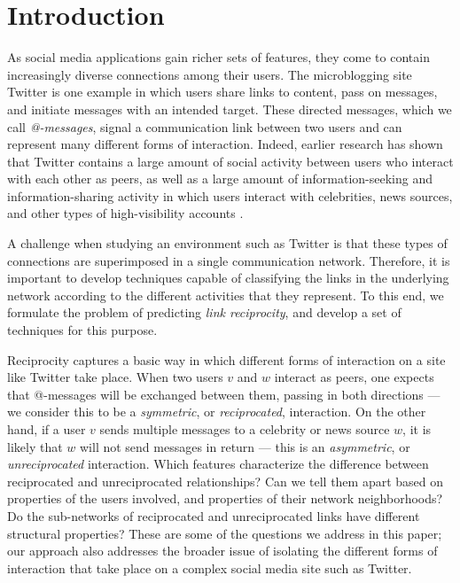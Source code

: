 \documentclass[conference]{IEEEtran}
\begin{document}
%
\IEEEpeerreviewmaketitle

\section{Introduction}

As social media applications gain richer sets of features,
they come to contain increasingly diverse 
connections among their users.
The microblogging site Twitter is one example in which users share
links to content, pass on messages, and initiate messages with an 
intended target.  These directed messages, which we call \emph{@-messages}, 
signal a communication link between two users and 
can represent many different forms of interaction.
Indeed, earlier research has shown that Twitter contains
a large amount of social activity between users who interact
with each other as peers, as well as a large amount of information-seeking
and information-sharing activity in which users interact with
celebrities, news sources, and other types of high-visibility accounts
\cite{kwak-what-is-twitter,romero-directed-closure}.

A challenge when studying an environment such as Twitter
is that these types of connections are superimposed 
in a single communication network.
Therefore, it is important to develop techniques capable of
classifying the links in the underlying network according to 
the different activities that they represent.  To this end, we
formulate the problem of predicting {\em link reciprocity}, and
develop a set of techniques for this purpose.

Reciprocity captures a basic way in which different forms of
interaction on a site like Twitter take place.
When two users $v$ and $w$ interact as peers, one expects that @-messages
will be exchanged between them, passing in both directions --- we consider
this to be a {\em symmetric}, or {\em reciprocated}, interaction.
On the other hand, if a user $v$ sends multiple messages to a
celebrity or news source $w$, it is likely that $w$ will not
send messages in return --- this is an
{\em asymmetric}, or {\em unreciprocated} interaction.
Which features characterize the difference between reciprocated and
unreciprocated relationships?  Can we tell them apart based on
properties of the users involved, 
and properties of their network neighborhoods?
Do the sub-networks of reciprocated and unreciprocated links have
different structural properties?
These are some of the questions we address in this paper;
our approach also addresses
the broader issue of isolating the different
forms of interaction that take place on a complex social media 
site such as Twitter.
\end{document}
